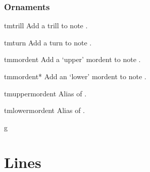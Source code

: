\documentclass[11pt,a4paper]{ltxdoc}
\begin{document}
\subsubsection{Ornaments}\label{sec:music-notes:misc:ornaments}
\begin{docCommand}{tmtrill}{}
  Add a trill to note .
\end{docCommand}
\begin{docCommand}{tmturn}{}
  Add a turn to note .
\end{docCommand}
\begin{docCommand}{tmmordent}{}
  Add a `upper' mordent to note .
\end{docCommand}
\begin{docCommand}{tmmordent*}{}
  Add an `lower' mordent to note .
\end{docCommand}
\begin{docCommand}{tmuppermordent}{}
  Alias of .
\end{docCommand}
\begin{docCommand}{tmlowermordent}{}
  Alias of .
\end{docCommand}
\begin{dispExample}
\begin{tmsinglestaff}
  \begin{tmstaff}{g}
      
     
  \end{tmstaff}
\end{tmsinglestaff}
\end{dispExample}
\section{Lines}\label{sec:line}
\end{document}
